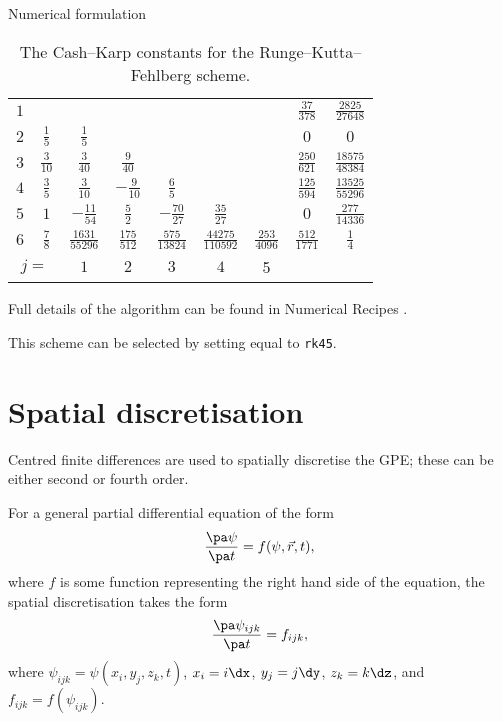 \begin{chapter}{\label{cha:numerics}Numerical formulation}
\begin{table}
\begin{tabular}{|c|c|ccccc|c|c|}
      \hline
      $1$ & & & & & & & $\frac{37}{378}$ & $\frac{2825}{27648}$ \\
      $2$ & $\frac{1}{5}$ & $\frac{1}{5}$ & & & & & $0$ & $0$ \\
      $3$ & $\frac{3}{10}$ & $\frac{3}{40}$ & $\frac{9}{40}$ & & & & $\frac{250}{621}$ & $\frac{18575}{48384}$ \\
      $4$ & $\frac{3}{5}$ & $\frac{3}{10}$ & $-\frac{9}{10}$ & $\frac{6}{5}$ & & & $\frac{125}{594}$ & $\frac{13525}{55296}$ \\
      $5$ & $1$ & $-\frac{11}{54}$ & $\frac{5}{2}$ & $-\frac{70}{27}$ & $\frac{35}{27}$ & & $0$ & $\frac{277}{14336}$ \\
      $6$ & $\frac{7}{8}$ & $\frac{1631}{55296}$ & $\frac{175}{512}$ & $\frac{575}{13824}$ & $\frac{44275}{110592}$ & $\frac{253}{4096}$ & $\frac{512}{1771}$ & $\frac{1}{4}$ \\
      \hline
      \multicolumn{2}{|c}{$j=$} & $1$ & $2$ & $3$ & $4$ & \multicolumn{1}{c}{5} & \multicolumn{2}{c|}{} \\
      \hline
    \end{tabular}
    \caption{\label{tab:cash_karp}The Cash--Karp constants for the
      Runge--Kutta--Fehlberg scheme.}
  \end{table}
  Full details of the algorithm can be found in Numerical Recipes \citep[\S
  16.2, p.708,][]{NR92}.

  This scheme can be selected by setting  equal to \verb"rk45".

  \section{Spatial discretisation}
  Centred finite differences are used to spatially discretise the GPE; these
  can be either second or fourth order.

  For a general partial differential equation of the form
  \begin{equation*}
    \frac{\pa \psi}{\pa t} = f(\psi, \vec{r}, t),
  \end{equation*}
  where $f$ is some function representing the right hand side of the equation,
  the spatial discretisation takes the form
  \begin{equation*}
    \frac{\pa \psi_{ijk}}{\pa t} = f_{ijk},
  \end{equation*}
  where $\psi_{ijk} = \psi\left( x_{i}, y_{j}, z_{k}, t \right)$, $x_{i} =
  i\dx$, $y_{j} = j\dy$, $z_{k} = k\dz$, and $f_{ijk} = f\left( \psi_{ijk}
  \right)$.


\end{chapter}
